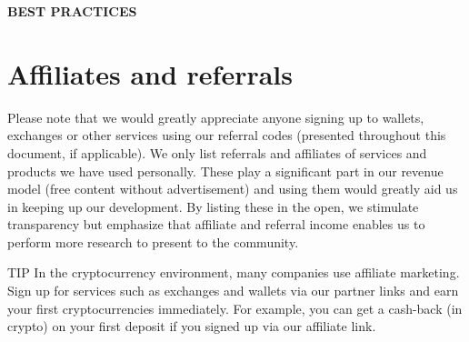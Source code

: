     \bigskip
    \begin{cryptobox}{\textbf{BEST PRACTICES}}
    
    \textit{}
        
    \end{cryptobox}
    \medskip  

\medskip

\section*{Affiliates and referrals}
Please note that we would greatly appreciate anyone signing up to wallets, exchanges or other services using our referral codes (presented throughout this document, if applicable). We only list referrals and affiliates of services and products we have used personally. These play a significant part in our revenue model (free content without advertisement) and using them would greatly aid us in keeping up our development. By listing these in the open, we stimulate transparency but emphasize that affiliate and referral income enables us to perform more research to present to the community.

    \medskip
    \begin{tipbox}{TIP}
    In the cryptocurrency environment, many companies use affiliate marketing. Sign up for services such as exchanges and wallets via our partner links and earn your first cryptocurrencies immediately. For example, you can get a cash-back (in crypto) on your first deposit if you signed up via our affiliate link.
    \end{tipbox}
    \medskip

